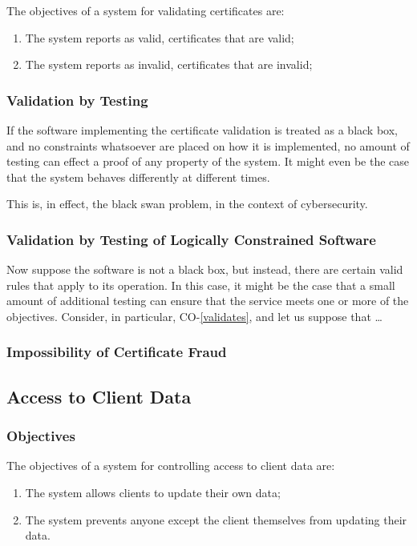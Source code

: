 \documentclass[journal]{IEEEtran}
\begin{document}
The objectives of a system for validating certificates are:
\begin{enumerate}[CO-1]
  \item\label{validates} The system reports as valid, certificates that are valid;
  \item The system reports as invalid, certificates that are invalid;
\end{enumerate}

\subsubsection{Validation by Testing}

If the software implementing the certificate validation is treated
as a black box, and no constraints whatsoever are placed on how it is
implemented, no amount of testing can effect a proof of any
property of the system. It might even be the case that the system
behaves differently at different times.

This is, in effect, the black swan problem, in the context of cybersecurity.

\subsubsection{Validation by Testing of Logically Constrained Software}

Now suppose the software is not a black box, but instead, there
are certain valid rules that apply to its operation. In this case,
it might be the case that a small amount of additional testing
can ensure that the service meets one or more of the objectives.
Consider, in particular, CO-\ref{validates}, and let us suppose
that \dots

\subsubsection{Impossibility of Certificate Fraud}

\subsection{Access to Client Data}

\subsubsection{Objectives}

The objectives of a system for controlling access to client data are:
\begin{enumerate}[DO-1]
  \item The system allows clients to update their own data;
  \item The system prevents anyone except the client themselves from updating their data.
\end{enumerate}
\end{document}
